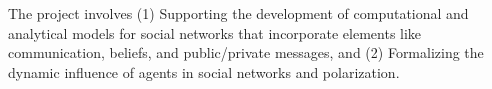 \documentclass[preview]{standalone}
\begin{document}
The project involves (1) Supporting the development of computational and analytical models for social networks that incorporate elements like communication, beliefs, and public/private messages, and (2) Formalizing the dynamic influence of agents in social networks and polarization.\\
\end{document}
